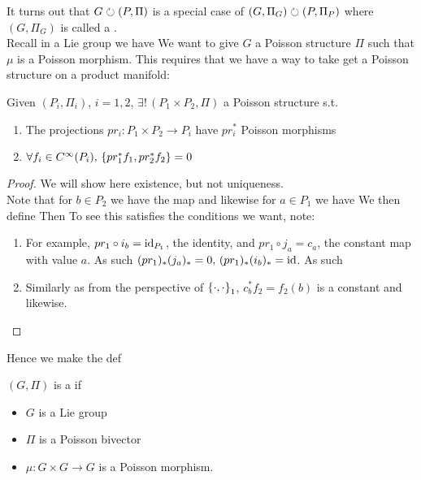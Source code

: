 \documentclass{article}
\begin{document}
It turns out that $G \lact (P,\Pi)$ is a special case of  $(G,\Pi_G) \lact (P,\Pi_P)$ where $(G,\Pi_G)$ is called a . \\
Recall in a Lie group we have 
We want to give $G$ a Poisson structure $\Pi$ such that $\mu$ is a Poisson morphism. This requires that we have a way to take get a Poisson structure on a product manifold:
\begin{prop}
Given $(P_i,\Pi_i)$, $i=1,2$, $\exists! \,  (P_1 \times P_2, \Pi)$ a Poisson structure s.t. 
\begin{enumerate}
    \item The projections $pr_i : P_1 \times P_2 \to P_i$ have $pr_i^\ast $ Poisson morphisms 
    \item $\forall f_i \in C^\infty(P_i), \, \acomm[pr_1^\ast f_1]{pr_2^\ast f_2} = 0$
\end{enumerate}
\end{prop}
\begin{proof}
We will show here existence, but not uniqueness. \\
Note that for $b \in P_2$ we have the map 
and likewise for $a \in P_1$ we have 
We then define 
Then 
To see this satisfies the conditions we want, note:
\begin{enumerate}
    \item For example, $pr_1 \circ i_b = \id_{P_1}$, the identity, and  $pr_1\circ j_a = c_a$, the constant map with value $a$. As such $(pr_1)_\ast (j_a)_\ast =0, \, (pr_1)_\ast (i_b)_\ast = \id$. As such 
    \item Similarly 
    as from the perspective of $\acomm[\cdot]{\cdot}_1$, $c_b^\ast f_2 = f_2(b)$ is a constant and likewise.
\end{enumerate}
\end{proof}
Hence we make the def
\begin{definition}
$(G,\Pi)$ is a  if 
\begin{itemize}
    \item $G$ is a Lie group
    \item $\Pi$ is a Poisson bivector
    \item $\mu : G \times G \to G$ is a Poisson morphism. 
\end{itemize}
\end{definition}
\end{document}
